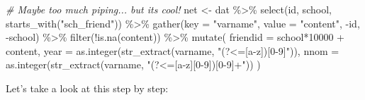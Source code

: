\documentclass[
]{book}
\newenvironment{Shaded}{\begin{snugshade}}{\end{snugshade}}
\newcommand{\AttributeTok}[1]{\textcolor[rgb]{0.77,0.63,0.00}{#1}}
\newcommand{\CommentTok}[1]{\textcolor[rgb]{0.56,0.35,0.01}{\textit{#1}}}
\newcommand{\DecValTok}[1]{\textcolor[rgb]{0.00,0.00,0.81}{#1}}
\newcommand{\FunctionTok}[1]{\textcolor[rgb]{0.00,0.00,0.00}{#1}}
\newcommand{\NormalTok}[1]{#1}
\newcommand{\OtherTok}[1]{\textcolor[rgb]{0.56,0.35,0.01}{#1}}
\newcommand{\SpecialCharTok}[1]{\textcolor[rgb]{0.00,0.00,0.00}{#1}}
\newcommand{\StringTok}[1]{\textcolor[rgb]{0.31,0.60,0.02}{#1}}
\begin{document}
\begin{Shaded}
\begin{Highlighting}[]
\CommentTok{\# Maybe too much piping... but its cool!}
\NormalTok{net }\OtherTok{\textless{}{-}}\NormalTok{ dat }\SpecialCharTok{\%\textgreater{}\%} 
  \FunctionTok{select}\NormalTok{(id, school, }\FunctionTok{starts\_with}\NormalTok{(}\StringTok{"sch\_friend"}\NormalTok{)) }\SpecialCharTok{\%\textgreater{}\%}
  \FunctionTok{gather}\NormalTok{(}\AttributeTok{key =} \StringTok{"varname"}\NormalTok{, }\AttributeTok{value =} \StringTok{"content"}\NormalTok{, }\SpecialCharTok{{-}}\NormalTok{id, }\SpecialCharTok{{-}}\NormalTok{school) }\SpecialCharTok{\%\textgreater{}\%}
  \FunctionTok{filter}\NormalTok{(}\SpecialCharTok{!}\FunctionTok{is.na}\NormalTok{(content)) }\SpecialCharTok{\%\textgreater{}\%}
  \FunctionTok{mutate}\NormalTok{(}
    \AttributeTok{friendid =}\NormalTok{ school}\SpecialCharTok{*}\DecValTok{10000} \SpecialCharTok{+}\NormalTok{ content,}
    \AttributeTok{year     =} \FunctionTok{as.integer}\NormalTok{(}\FunctionTok{str\_extract}\NormalTok{(varname, }\StringTok{"(?\textless{}=[a{-}z])[0{-}9]"}\NormalTok{)),}
    \AttributeTok{nnom     =} \FunctionTok{as.integer}\NormalTok{(}\FunctionTok{str\_extract}\NormalTok{(varname, }\StringTok{"(?\textless{}=[a{-}z][0{-}9])[0{-}9]+"}\NormalTok{))}
\NormalTok{  )}
\end{Highlighting}
\end{Shaded}

Let's take a look at this step by step:
\end{document}
